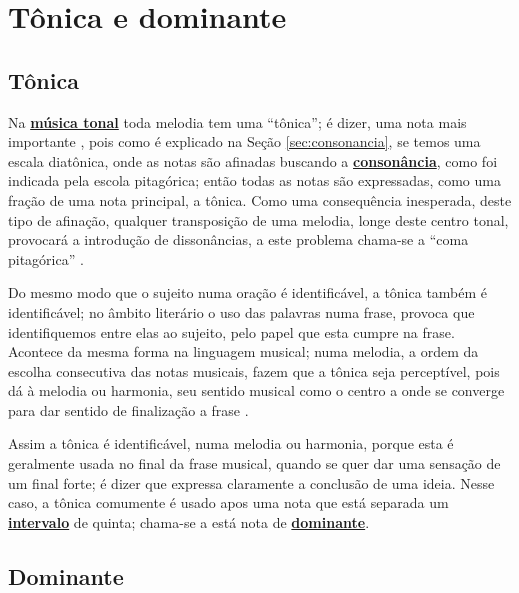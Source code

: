 \section{Tônica e dominante}
\label{sec:Tonica}
\label{sec:dominante}

\subsection{Tônica}

Na \hyperref[sec:MusicaTonal]{\textbf{música tonal}} toda melodia tem uma ``tônica''; 
é dizer, uma nota mais importante \cite[pp. 19]{holst1998abc}, 
pois como é explicado na Seção \ref{sec:consonancia}, se temos uma escala diatônica,
onde as notas são afinadas buscando a \hyperref[ref:consonancia]{\textbf{consonância}},
como foi indicada pela escola pitagórica; então todas as notas são expressadas,
como uma fração de uma nota principal, a tônica. 
Como uma consequência inesperada, deste tipo de afinação, 
qualquer transposição de uma melodia, longe deste centro tonal, 
provocará a introdução de dissonâncias,
a este problema chama-se a ``coma pitagórica'' \cite[pp. 24]{arbones2012armonia}.
 

Do mesmo modo que o sujeito numa oração é identificável, a tônica também é identificável;
no âmbito literário o uso das palavras numa frase, 
provoca que identifiquemos entre elas ao sujeito, pelo papel que esta cumpre na frase.
Acontece da mesma forma na linguagem musical; numa melodia,
a ordem da escolha consecutiva das notas musicais, 
fazem que a tônica seja perceptível, pois dá à melodia ou harmonia, 
seu sentido musical como o centro a onde se converge para dar sentido de finalização a frase \cite[pp. 19]{holst1998abc}.

Assim a tônica é identificável, numa melodia ou harmonia, 
porque esta é geralmente  usada no final  da frase musical, 
quando se quer dar uma sensação de um final forte;
é dizer que expressa claramente a conclusão de uma ideia.
Nesse caso, a tônica comumente é usado apos uma nota que está separada um 
\hyperref[sec:intervalomelodico]{\textbf{intervalo}} de quinta;
chama-se a está nota de \hyperref[sec:dominante]{\textbf{dominante}}.

\subsection{Dominante}
\label{sec:dominante}

